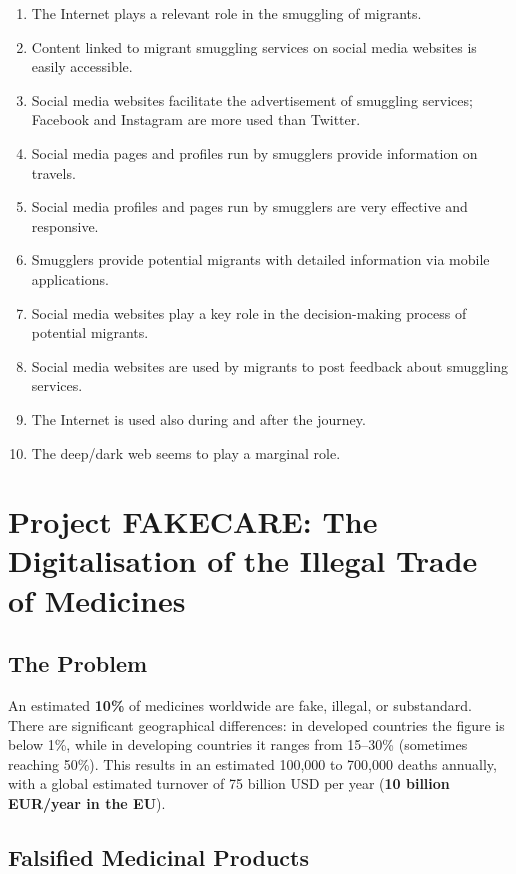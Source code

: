 \documentclass[11pt,a4paper,openany]{report}
\theoremstyle{definition}
\theoremstyle{plain}
\theoremstyle{remark}
\begin{document}
\begin{enumerate}
    \item The Internet plays a relevant role in the smuggling of migrants.
    \item Content linked to migrant smuggling services on social media websites is easily accessible.
    \item Social media websites facilitate the advertisement of smuggling services; Facebook and Instagram are more used than Twitter.
    \item Social media pages and profiles run by smugglers provide information on travels.
    \item Social media profiles and pages run by smugglers are very effective and responsive.
    \item Smugglers provide potential migrants with detailed information via mobile applications.
    \item Social media websites play a key role in the decision-making process of potential migrants.
    \item Social media websites are used by migrants to post feedback about smuggling services.
    \item The Internet is used also during and after the journey.
    \item The deep/dark web seems to play a marginal role.
\end{enumerate}


\section{Project FAKECARE: The Digitalisation of the Illegal Trade of Medicines}

\subsection{The Problem}

An estimated \textbf{10\%} of medicines worldwide are fake, illegal, or substandard. There are significant geographical differences: in developed countries the figure is below 1\%, while in developing countries it ranges from 15--30\% (sometimes reaching 50\%). This results in an estimated 100,000 to 700,000 deaths annually, with a global estimated turnover of 75 billion USD per year (\textbf{10 billion EUR/year in the EU}).

\subsection{Falsified Medicinal Products}
\end{document}
